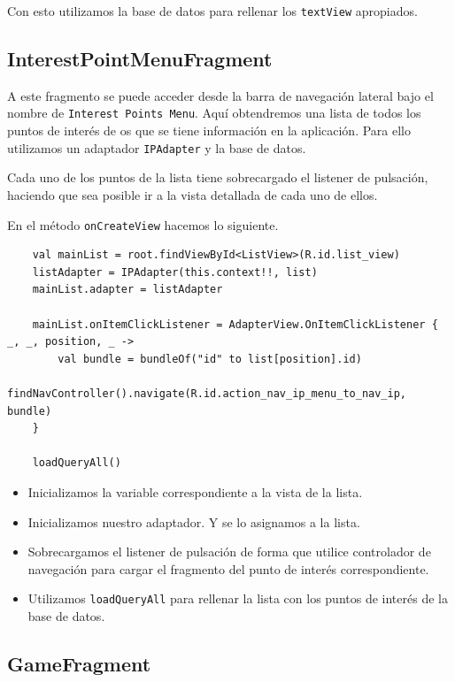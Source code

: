 \documentclass[11pt]{article}
\begin{document}
Con esto utilizamos la base de datos para rellenar los \texttt{textView} apropiados.

\subsection{InterestPointMenuFragment}
\label{sec:orge7ed27d}

A este fragmento se puede acceder desde la barra de navegación lateral bajo el nombre de \texttt{Interest Points Menu}. Aquí obtendremos una lista de todos los puntos de interés de os que se tiene información en la aplicación. Para ello utilizamos un adaptador \texttt{IPAdapter} y la base de datos.

Cada uno de los puntos de la lista tiene sobrecargado el listener de pulsación, haciendo que sea posible ir a la vista detallada de cada uno de ellos.

En el método \texttt{onCreateView} hacemos lo siguiente.

\begin{verbatim}
    val mainList = root.findViewById<ListView>(R.id.list_view)
    listAdapter = IPAdapter(this.context!!, list)
    mainList.adapter = listAdapter

    mainList.onItemClickListener = AdapterView.OnItemClickListener { _, _, position, _ ->
        val bundle = bundleOf("id" to list[position].id)
        findNavController().navigate(R.id.action_nav_ip_menu_to_nav_ip, bundle)
    }
    
    loadQueryAll()
\end{verbatim}

\begin{itemize}
\item Inicializamos la variable correspondiente a la vista de la lista.
\item Inicializamos nuestro adaptador. Y se lo asignamos a la lista.
\item Sobrecargamos el listener de pulsación de forma que utilice controlador de navegación para cargar el fragmento del punto de interés correspondiente.
\item Utilizamos \texttt{loadQueryAll} para rellenar la lista con los puntos de interés de la base de datos.
\end{itemize}

\subsection{GameFragment}
\label{sec:org0e10f51}
\end{document}
